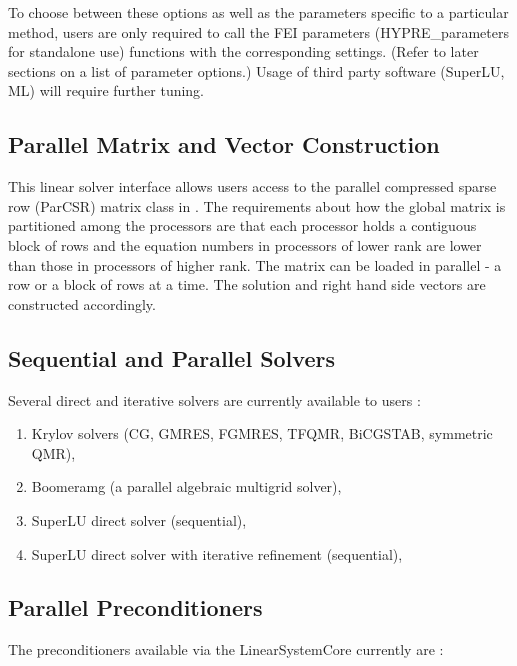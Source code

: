 To choose between these options as well as the parameters specific to a
particular method, users are only required to call the FEI {\sf parameters}
({\sf HYPRE\_parameters} for standalone use)
functions with the corresponding settings.  (Refer to later sections on   
a list of parameter options.)  Usage of third party software (SuperLU, ML)
will require further tuning.

\subsection{Parallel Matrix and Vector Construction} 

This linear solver interface allows users access to the parallel compressed
sparse row ({\sf ParCSR}) matrix class in \hypre{}.  
The requirements about how the global matrix is partitioned among the
processors are that each processor holds a contiguous block of rows 
and the equation numbers in processors of lower rank are lower than those
in processors of higher rank.  The matrix can be loaded in parallel - 
a row or a block of rows at a time.  The solution and right hand side vectors
are constructed accordingly.

\subsection{Sequential and Parallel Solvers} 

Several direct and iterative solvers are currently available to users :

\begin{enumerate}
\item Krylov solvers (CG, GMRES, FGMRES, TFQMR, BiCGSTAB, symmetric QMR),
\item Boomeramg (a parallel algebraic multigrid solver),
\item SuperLU direct solver (sequential),
\item SuperLU direct solver with iterative refinement (sequential), 
\end{enumerate}

\subsection{Parallel Preconditioners} 

The \hypre{} preconditioners available via the {\sf LinearSystemCore} 
currently are :

